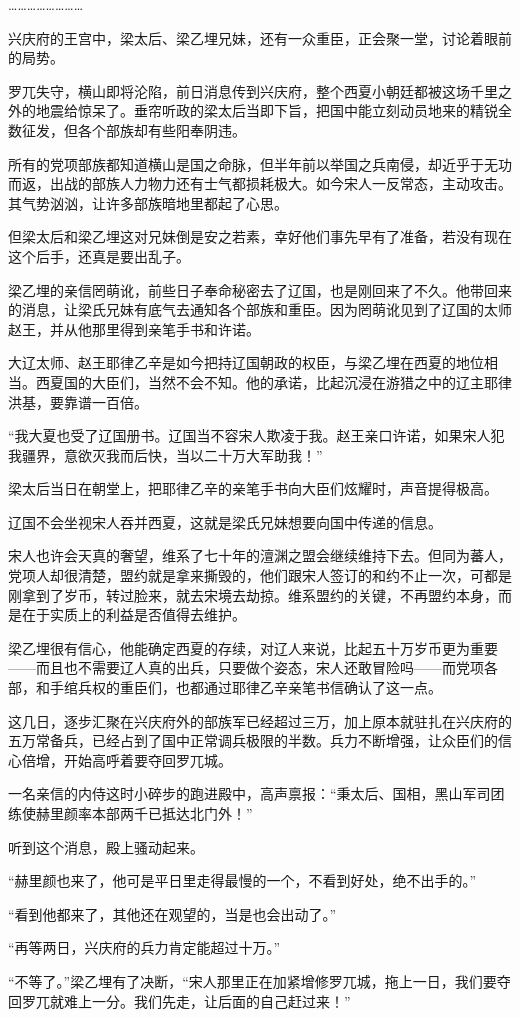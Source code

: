 ……………………

兴庆府的王宫中，梁太后、梁乙埋兄妹，还有一众重臣，正会聚一堂，讨论着眼前的局势。

罗兀失守，横山即将沦陷，前日消息传到兴庆府，整个西夏小朝廷都被这场千里之外的地震给惊呆了。垂帘听政的梁太后当即下旨，把国中能立刻动员地来的精锐全数征发，但各个部族却有些阳奉阴违。

所有的党项部族都知道横山是国之命脉，但半年前以举国之兵南侵，却近乎于无功而返，出战的部族人力物力还有士气都损耗极大。如今宋人一反常态，主动攻击。其气势汹汹，让许多部族暗地里都起了心思。

但梁太后和梁乙埋这对兄妹倒是安之若素，幸好他们事先早有了准备，若没有现在这个后手，还真是要出乱子。

梁乙埋的亲信罔萌讹，前些日子奉命秘密去了辽国，也是刚回来了不久。他带回来的消息，让梁氏兄妹有底气去通知各个部族和重臣。因为罔萌讹见到了辽国的太师赵王，并从他那里得到亲笔手书和许诺。

大辽太师、赵王耶律乙辛是如今把持辽国朝政的权臣，与梁乙埋在西夏的地位相当。西夏国的大臣们，当然不会不知。他的承诺，比起沉浸在游猎之中的辽主耶律洪基，要靠谱一百倍。

“我大夏也受了辽国册书。辽国当不容宋人欺凌于我。赵王亲口许诺，如果宋人犯我疆界，意欲灭我而后快，当以二十万大军助我！”

梁太后当日在朝堂上，把耶律乙辛的亲笔手书向大臣们炫耀时，声音提得极高。

辽国不会坐视宋人吞并西夏，这就是梁氏兄妹想要向国中传递的信息。

宋人也许会天真的奢望，维系了七十年的澶渊之盟会继续维持下去。但同为蕃人，党项人却很清楚，盟约就是拿来撕毁的，他们跟宋人签订的和约不止一次，可都是刚拿到了岁币，转过脸来，就去宋境去劫掠。维系盟约的关键，不再盟约本身，而是在于实质上的利益是否值得去维护。

梁乙埋很有信心，他能确定西夏的存续，对辽人来说，比起五十万岁币更为重要——而且也不需要辽人真的出兵，只要做个姿态，宋人还敢冒险吗——而党项各部，和手绾兵权的重臣们，也都通过耶律乙辛亲笔书信确认了这一点。

这几日，逐步汇聚在兴庆府外的部族军已经超过三万，加上原本就驻扎在兴庆府的五万常备兵，已经占到了国中正常调兵极限的半数。兵力不断增强，让众臣们的信心倍增，开始高呼着要夺回罗兀城。

一名亲信的内侍这时小碎步的跑进殿中，高声禀报：“秉太后、国相，黑山军司团练使赫里颜率本部两千已抵达北门外！”

听到这个消息，殿上骚动起来。

“赫里颜也来了，他可是平日里走得最慢的一个，不看到好处，绝不出手的。”

“看到他都来了，其他还在观望的，当是也会出动了。”

“再等两日，兴庆府的兵力肯定能超过十万。”

“不等了。”梁乙埋有了决断，“宋人那里正在加紧增修罗兀城，拖上一日，我们要夺回罗兀就难上一分。我们先走，让后面的自己赶过来！”

